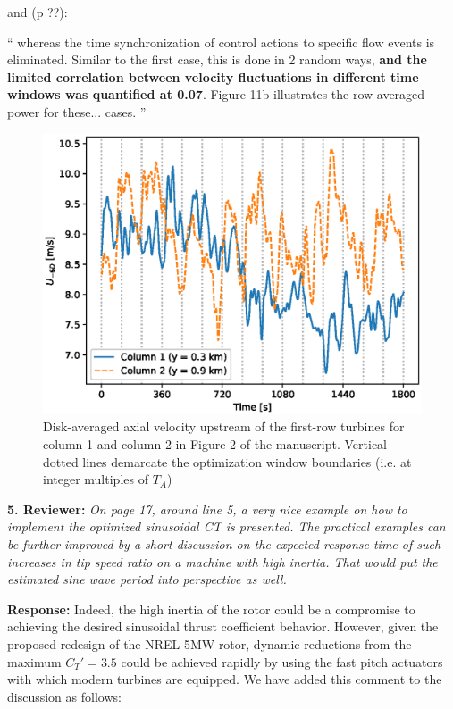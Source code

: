 \documentclass[]{article}
\begin{document}
and (p ??):

``
whereas the time synchronization of control actions to specific flow events is eliminated. Similar to the first case, this is done in 2 random ways, \textbf{and the limited correlation between velocity fluctuations in different time windows was quantified at 0.07}. Figure 11b illustrates the row-averaged power for these...
cases.
''

\begin{figure}
	\includegraphics[width=\textwidth]{upstream_vel.eps}
	\caption{Disk-averaged axial velocity upstream of the first-row turbines for column 1 and column 2 in Figure 2 of the manuscript. Vertical dotted lines demarcate the optimization window boundaries (i.e. at integer multiples of $T_A$) \label{fig:upstream_vel}}
\end{figure}

\dotfill

\textbf{5. Reviewer: } \textit{On page 17, around line 5, a very nice example on how to implement the optimized
	sinusoidal CT is presented. The practical examples can be further improved by a
	short discussion on the expected response time of such increases in tip speed ratio
	on a machine with high inertia. That would put the estimated sine wave period into
	perspective as well.}

\textbf{Response: } Indeed, the high inertia of the rotor could be a compromise to achieving the desired sinusoidal thrust coefficient behavior. However, given the proposed redesign of the NREL 5MW rotor, dynamic reductions from the maximum $C_T' = 3.5$ could be achieved rapidly by using the fast pitch actuators with which modern turbines are equipped. We have added this comment to the discussion as follows:  
\end{document}
